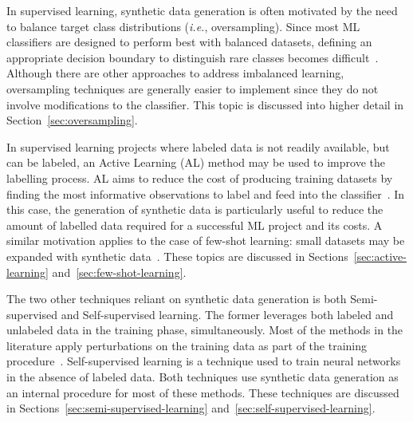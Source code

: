 \documentclass[parskip=full]{scrartcl}
\begin{document}
In supervised learning, synthetic data generation is often motivated by the
need to balance target class distributions (\textit{i.e.}, oversampling).
Since most ML classifiers are designed to perform best with balanced datasets,
defining an appropriate decision boundary to distinguish rare classes becomes
difficult~\cite{saez2016analyzing}. Although there are other approaches to
address imbalanced learning, oversampling techniques are generally easier to
implement since they do not involve modifications to the classifier. This
topic is discussed into higher detail in Section~\ref{sec:oversampling}.

In supervised learning projects where labeled data is not readily available,
but can be labeled, an Active Learning (AL) method may be used to improve the
labelling process. AL aims to reduce the cost of producing training datasets
by finding the most informative observations to label and feed into the
classifier~\cite{fonseca2021increasing}. In this case, the generation of
synthetic data is particularly useful to reduce the amount of labelled data
required for a successful ML project and its costs. A similar motivation
applies to the case of few-shot learning: small datasets may be expanded with
synthetic data~\cite{kumar2019closer}. These topics are discussed in
Sections~\ref{sec:active-learning} and~\ref{sec:few-shot-learning}.

The two other techniques reliant on synthetic data generation is both
Semi-supervised and Self-supervised learning. The former leverages both
labeled and unlabeled data in the training phase, simultaneously. Most of the
methods in the literature apply perturbations on the training data as part of
the training procedure~\cite{van2020survey}. Self-supervised learning is a
technique used to train neural networks in the absence of labeled data. Both
techniques use synthetic data generation as an internal procedure for most of
these methods. These techniques are discussed in
Sections~\ref{sec:semi-supervised-learning}
and~\ref{sec:self-supervised-learning}.



 
 
\end{document}
